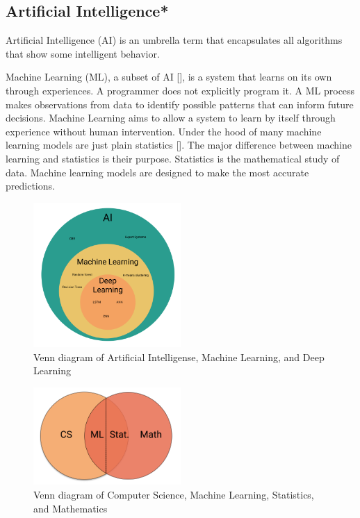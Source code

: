 \subsection{Artificial Intelligence*}
Artificial Intelligence (AI) is an umbrella term that encapsulates all algorithms that
show some intelligent behavior.

Machine Learning (ML), a subset of AI [], is a system that learns on its own through experiences.
A programmer does not explicitly program it. A ML process makes observations from data to identify possible
patterns that can inform future decisions. Machine Learning aims to allow a system to learn by itself through
experience without human intervention. Under the hood of many machine learning models are just plain statistics [].
The major difference between machine learning and statistics is their purpose.
Statistics is the mathematical study of data.
Machine learning models are designed to make the most accurate predictions.


\begin{figure}[h!]
  \centering
  \includegraphics[width=0.5\textwidth]{./figs/illustrations/illustration_venn_diagram_ml_deep_learning.png}
  \hfill
  \caption{Venn diagram of Artificial Intelligense, Machine Learning, and Deep Learning}
  \label{fig:venn-diagram-ml-deep-learning}
\end{figure}
\begin{figure}[h!]
  \centering
  \includegraphics[width=0.5\textwidth]{./figs/illustrations/illustration_venn_diagram_cs_ml_stat_math.png}
  \hfill
  \caption{Venn diagram of Computer Science, Machine Learning, Statistics, and Mathematics}
  \label{fig:venn-diagram-cs-ml-deep-learning}
\end{figure}